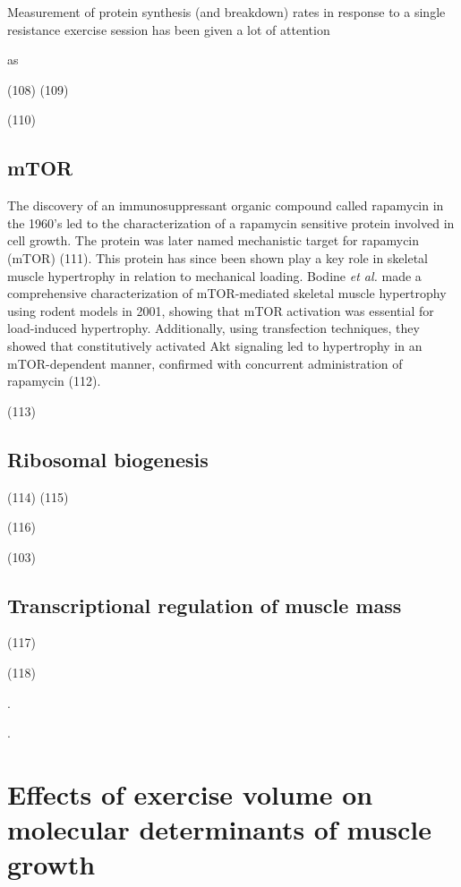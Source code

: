 \documentclass[twoside,10pt]{gihclass} %
\begin{document}
Measurement of protein synthesis (and breakdown) rates in response to a single resistance exercise session has been given a lot of attention

as

(108)
(109)

(110)

\hypertarget{mtor}{%
\subsection{mTOR}\label{mtor}}

The discovery of an immunosuppressant organic compound called rapamycin in the 1960's led to the characterization of a rapamycin sensitive protein involved in cell growth. The protein was later named mechanistic target for rapamycin (mTOR)
(111). This protein has since been shown play a key role in skeletal muscle hypertrophy in relation to mechanical loading. Bodine \emph{et al.} made a comprehensive characterization of mTOR-mediated skeletal muscle hypertrophy using rodent models in 2001, showing that mTOR activation was essential for load-induced hypertrophy. Additionally, using transfection techniques, they showed that constitutively activated Akt signaling led to hypertrophy in an mTOR-dependent manner, confirmed with concurrent administration of rapamycin (112).

(113)

\hypertarget{ribosomal-biogenesis}{%
\subsection{Ribosomal biogenesis}\label{ribosomal-biogenesis}}

(114)
(115)

(116)

(103)

\hypertarget{transcriptional-regulation-of-muscle-mass}{%
\subsection{Transcriptional regulation of muscle mass}\label{transcriptional-regulation-of-muscle-mass}}

(117)

(118)

.

.

\hypertarget{effects-of-exercise-volume-on-molecular-determinants-of-muscle-growth}{%
\section{Effects of exercise volume on molecular determinants of muscle growth}\label{effects-of-exercise-volume-on-molecular-determinants-of-muscle-growth}}
\end{document}
